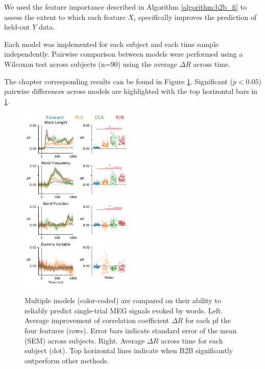 We used the feature importance described in Algorithm \ref{algorithm:b2b_fi} to assess the extent to which each feature $X_i$ specifically improves the prediction of held-out $Y$ data.

Each model was implemented for each subject and each time sample independently. Pairwise comparison between models were performed using a Wilcoxon test across subjects (n=90) using the average $\Delta R$ across time.

The chapter corresponding results can be found in Figure \ref{fig:meg_results}. Significant ($p<0.05$) pairwise differences across models are highlighted with the top horizontal bars in \ref{fig:meg_results}.



\begin{figure}
  \begin{center}
    \includegraphics[width=0.48\textwidth, trim=0cm 0cm 0cm 0cm, clip=True]{figures/meg.pdf}

    \label{fig:meg_results}
  \end{center}
  \caption{Multiple models (color-coded) are compared on their ability to reliably predict single-trial MEG signals evoked by words. Left. Average improvement of correlation coefficient $\Delta R$ for each pf the four features (rows). Error bars indicate standard error of the mean (SEM) across subjects. Right. Average $\Delta R$ across time for each subject (dot). Top horizontal lines indicate when B2B significantly outperform other methods.}
\end{figure}

